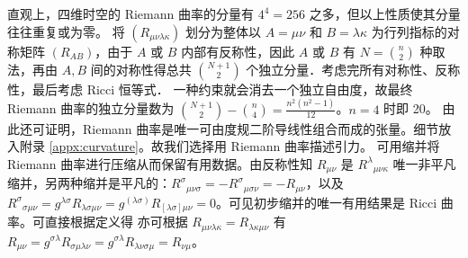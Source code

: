 直观上，四维时空的 Riemann 曲率的分量有 $4^4=256$ 之多，但以上性质使其分量往往重复或为零。
将 $(R_{\mu\nu\lambda\kappa})$ 划分为整体以 $A=\mu\nu$ 和 $B=\lambda\kappa$ 为行列指标的对称矩阵 $(R_{AB})$，由于 $A$ 或 $B$ 内部有反称性，因此 $A$ 或 $B$ 有 $N=\binom{n}{2}$ 种取法，再由 $A,B$ 间的对称性得总共 $\binom{N+1}{2}$ 个独立分量．考虑完所有对称性、反称性，最后考虑 Ricci 恒等式．
一种约束就会消去一个独立自由度，故最终 Riemann 曲率的独立分量数为 $\binom{N+1}{2}-\binom{n}{4}=\frac{n^2(n^2-1)}{12}$。$n=4$ 时即 20。
由此还可证明，Riemann 曲率是唯一可由度规二阶导线性组合而成的张量。细节放入附录 \ref{appx:curvature}。故我们选择用 Riemann 曲率描述引力。
可用缩并将 Riemann 曲率进行压缩从而保留有用数据。由反称性知
$R_{\mu\nu}$ 是 ${R^\lambda}_{\mu\nu\kappa}$ 唯一非平凡缩并，另两种缩并是平凡的：$R^\sigma{}_{\mu\nu\sigma}=-R^\sigma{}_{\mu\sigma\nu}=-R_{\mu\nu}$，以及 $R^\sigma{}_{\sigma\mu\nu}=g^{\lambda\sigma}R_{\lambda\sigma\mu\nu}=g^{(\lambda\sigma)}R_{[\lambda\sigma]\mu\nu}=0$。可见初步缩并的唯一有用结果是 Ricci 曲率。可直接根据定义得
亦可根据 $R_{\mu\nu\lambda\kappa}=R_{\lambda\kappa\mu\nu}$ 有 $R_{\mu\nu}=g^{\sigma\lambda}R_{\sigma\mu\lambda\nu}=g^{\sigma\lambda}R_{\lambda\nu\sigma\mu}=R_{\nu\mu}$。

